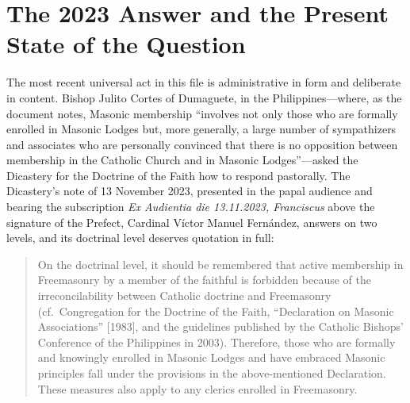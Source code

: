 \section{The 2023 Answer and the Present State of the Question}

The most recent universal act in this file is administrative in form and deliberate in content. Bishop Julito Cortes of Dumaguete, in the Philippines---where, as the document notes, Masonic membership ``involves not only those who are formally enrolled in Masonic Lodges but, more generally, a large number of sympathizers and associates who are personally convinced that there is no opposition between membership in the Catholic Church and in Masonic Lodges''---asked the Dicastery for the Doctrine of the Faith how to respond pastorally. The Dicastery's note of 13 November 2023, presented in the papal audience and bearing the subscription \emph{Ex Audientia die 13.11.2023, Franciscus} above the signature of the Prefect, Cardinal V\'ictor Manuel Fern\'andez, answers on two levels, and its doctrinal level deserves quotation in full:

\begin{quote}
On the doctrinal level, it should be remembered that active membership in Freemasonry by a member of the faithful is forbidden because of the irreconcilability between Catholic doctrine and Freemasonry (cf.\ Congregation for the Doctrine of the Faith, ``Declaration on Masonic Associations'' [1983], and the guidelines published by the Catholic Bishops' Conference of the Philippines in 2003). Therefore, those who are formally and knowingly enrolled in Masonic Lodges and have embraced Masonic principles fall under the provisions in the above-mentioned Declaration. These measures also apply to any clerics enrolled in Freemasonry.
\end{quote}

